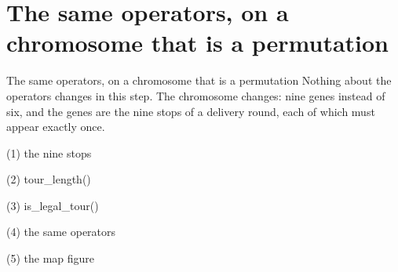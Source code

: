 
\section{The same operators, on a chromosome that is a permutation}

\begin{frame}{The same operators, on a chromosome that is a permutation}
Nothing about the operators changes in this step. The chromosome changes: nine
genes instead of six, and the genes are the nine stops of a delivery round, each
of which must appear exactly once.
\end{frame}

\begin{frame}[fragile]{(1) the nine stops}

\end{frame}

\begin{frame}[fragile]{(2) tour\_length()}

\end{frame}

\begin{frame}[fragile]{(3) is\_legal\_tour()}

\end{frame}

\begin{frame}[fragile]{(4) the same operators}

\end{frame}

\begin{frame}[fragile]{(5) the map figure}

\end{frame}

